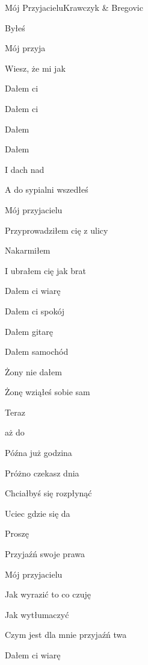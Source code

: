 \begin{song}{Mój Przyjacielu}{}{}{Krawczyk \& Bregovic}{}{}
  \begin{SBVerse}

    Byłeś  

    Mój przyja

    Wiesz, że  mi jak 

    Dałem ci 

    Dałem ci 

    Dałem 

    Dałem 

    I dach nad 

    A do sypialni wszedłeś 
  \end{SBVerse}
  \begin{SBVerse}
    Mój przyjacielu

    Przyprowadziłem cię z ulicy

    Nakarmiłem

    I ubrałem cię jak brat

    Dałem ci wiarę

    Dałem ci spokój

    Dałem gitarę

    Dałem samochód

    Żony nie dałem

    Żonę wziąłeś sobie sam
  \end{SBVerse}
  \begin{SBChorus}
    Teraz 

     aż do 

    Późna już godzina

    Próżno czekasz dnia

    Chciałbyś się rozpłynąć

    Uciec gdzie się da

    Proszę 

    Przyjaźń swoje prawa 
  \end{SBChorus}
  \begin{SBVerse}
    Mój przyjacielu

    Jak wyrazić to co czuję

    Jak wytłumaczyć

    Czym jest dla mnie przyjaźń twa

    Dałem ci wiarę


\end{SBVerse}
\end{song}
